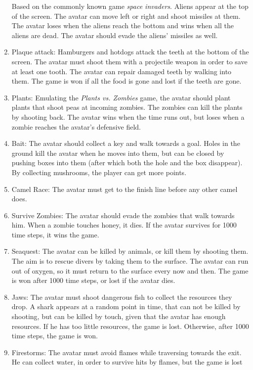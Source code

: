 \begin{enumerate}
		Based on the commonly known game \textit{space invaders}. Aliens appear
		at the top of the screen. The avatar can move left or right and shoot
		missiles at them. The avatar loses when the aliens reach the bottom and
		wins when all the aliens are dead. The avatar should evade the aliens'
		missiles as well.
	\item Plaque attack:
		Hamburgers and hotdogs attack the teeth at the bottom of the screen. The
		avatar must shoot them with a projectile weapon in order to save at
		least one tooth. The avatar can repair damaged teeth by walking into
		them. The game is won if all the food is gone and lost if the teeth are
		gone.
	\item Plants:
		Emulating the \textit{Plants vs. Zombies} game, the avatar should plant
		plants that shoot peas at incoming zombies. The zombies can kill the
		plants by shooting back. The avatar wins when the time runs out, but
		loses when a zombie reaches the avatar's defensive field.
	\item Bait: 
		The avatar should collect a key and walk towards a goal. Holes in the
		ground kill the avatar when he moves into them, but can be closed by
		pushing boxes into them (after which both the hole and the box
		disappear). By collecting mushrooms, the player can get more points.
	\item Camel Race:
		The avatar must get to the finish line before any other camel does.
	\item Survive Zombies:
		The avatar should evade the zombies that walk towards him. When a zombie
		touches honey, it dies. If the avatar survives for 1000 time steps, it
		wins the game.
	\item Seaquest:
		The avatar can be killed by animals, or kill them by shooting them. The
		aim is to  rescue divers by taking them to the surface. The avatar can
		run out of oxygen, so it must return to the surface every now and then.
		The game is won after 1000 time steps, or lost if the avatar dies.
	\item Jaws:
		The avatar must shoot dangerous fish to collect the resources they drop.
		A shark appears at a random point in time, that can not be killed by
		shooting, but can be killed by touch, given that the avatar has enough
		resources. If he has too little resources, the game is lost. Otherwise,
		after 1000 time steps, the game is won.
	\item Firestorms:
		The avatar must avoid flames while traversing towards the exit. He can
		collect water, in order to survive hits by flames, but the game is lost

\end{enumerate}
